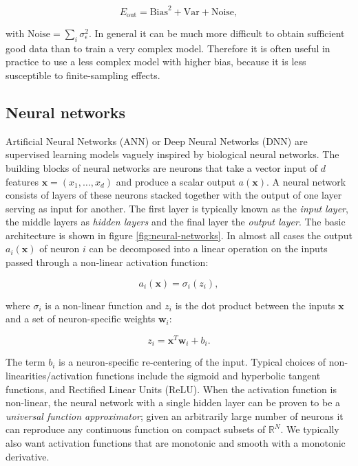 \begin{equation}
    E_{\text{out}} = \text{Bias}^2 + \text{Var} + \text{Noise},
\end{equation}

with $\text{Noise} = \sum_i \sigma_{\epsilon}^2$.
In general it can be much more difficult to obtain sufficient good data
than to train a very complex model. Therefore it is often useful in practice
to use a less complex model with higher bias, because it is less susceptible
to finite-sampling effects.

\subsection{Neural networks}
Artificial Neural Networks (ANN) or Deep Neural Networks (DNN) are
supervised learning models vaguely inspired by biological neural networks.
The building blocks of neural networks are neurons that take a
vector input of $d$ features $\bm{x} = (x_1,\dots,x_d)$
and produce a scalar output $a(\bm{x})$.
A neural network consists of layers of these neurons stacked together
with the output of one layer serving as input for another. The
first layer is typically known as the \textit{input layer}, the
middle layers as \textit{hidden layers} and the final layer
the \textit{output layer}. The basic architecture is shown in
figure \ref{fig:neural-networks}.
In almost all cases the output $a_i(\bm{x})$ of neuron $i$ can be decomposed
into a linear operation on the inputs passed through a non-linear
activation function:

\begin{equation}
 a_i(\bm{x}) = \sigma_i(z_i) ,
\end{equation}

where $\sigma_i$ is a non-linear function and $z_i$
is the dot product between the inputs $\bm{x}$ and a set of
neuron-specific weights $\bm{w}_i$:

\begin{equation}
 z_i = \bm{x}^T \bm{w}_i + b_i .
\end{equation}

The term $b_i$ is a neuron-specific re-centering of the input.
Typical choices of non-linearities/activation functions include
the sigmoid and hyperbolic tangent functions, and Rectified Linear Units (ReLU).
When the activation function is non-linear, the neural network with a single hidden
layer can be proven to be a \textit{universal function approximator}\cite{
    hornik1989multilayer};
given an arbitrarily large number of neurons
it can reproduce any continuous function on 
compact subsets of $\mathbb{R}^N$.
We typically also want activation functions that are monotonic and smooth 
with a monotonic derivative.

